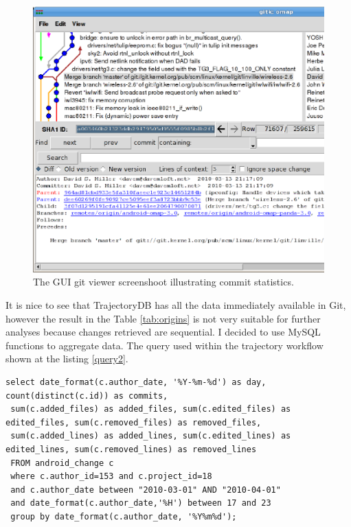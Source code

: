 \documentclass[a4paper,10pt]{article}
\numberwithin{equation}{subsection}
\begin{document}
\begin{figure}[h]
   \centering
   \includegraphics[width=\textwidth]{figures/Screenshot-gitk:omap.ps}
   \caption{The GUI git viewer screenshoot illustrating commit statistics.}
   \label{fig:git_screen}
\end{figure}

It is nice to see that TrajectoryDB has all the data immediately available in Git, however the result in the Table 
\ref{tab:origins} is not very suitable for further analyses because changes retrieved are sequential. I decided to
use MySQL functions to aggregate data. The query used within the trajectory workflow shown at the listing 
\ref{query2}.

\noindent\begin{minipage}{\textwidth}
\begin{lstlisting}[label=query2,caption=Data summary retrieval SQL query with aggergation by date]
select date_format(c.author_date, '%Y-%m-%d') as day, count(distinct(c.id)) as commits, 
 sum(c.added_files) as added_files, sum(c.edited_files) as edited_files, sum(c.removed_files) as removed_files, 
 sum(c.added_lines) as added_lines, sum(c.edited_lines) as edited_lines, sum(c.removed_lines) as removed_lines 
 FROM android_change c 
 where c.author_id=153 and c.project_id=18 
 and c.author_date between "2010-03-01" AND "2010-04-01"
 and date_format(c.author_date,'%H') between 17 and 23 
 group by date_format(c.author_date, '%Y%m%d');
\end{lstlisting}
\end{minipage}
\end{document}
